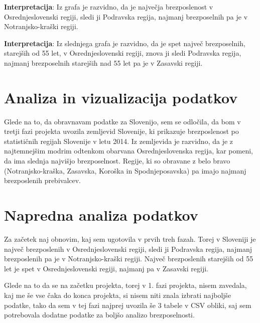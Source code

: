 \documentclass[11pt,a4paper]{article}
\begin{document}
\textbf{Interpretacija}: Iz grafa je razvidno, da je največja brezposlenost v Osrednjeslovenski regiji, sledi ji Podravska regija, najmanj brezposelnih pa je v Notranjsko-kraški regiji.

\textbf{Interpretacija}: Iz slednjega grafa je razvidno, da je spet največ brezposelnih, starejših od 55 let, v Osrednjeslovenski regiji, znova ji sledi Podravska regija, najmanj brezposelnih starejših nad 55 let pa je v Zasavski regiji.

\newpage

\section{Analiza in vizualizacija podatkov}

Glede na to, da obravnavam podatke za Slovenijo, sem se odločila, da bom v tretji fazi projekta uvozila zemljevid Slovenije, ki prikazuje brezposlenost po statističnih regijah Slovenije v letu 2014. Iz zemljevida je razvidno, da je z najtemnejšim modrim odtenkom obarvana Osrednjeslovenska regija, kar pomeni, da ima slednja najvišjo brezposelnost. Regije, ki so obravane z belo bravo (Notranjsko-kraška, Zasavska, Koroška in Spodnjeposavska) pa imajo najmanj brezposlenih prebivalcev.


\newpage

\section{Napredna analiza podatkov}

Za začetek naj obnovim, kaj sem ugotovila v prvih treh fazah. Torej v Sloveniji je največ brezposlenih v Osrednjeslovenski regiji, sledi ji Podravska regija, najmanj brezposlenih pa je v Notranjsko-kraški regiji. Največ brezposlenih starejših od 55 let je spet v Osrednjeslovenski regiji, najmanj pa v Zasavski regiji.


Glede na to da se na začetku projekta, torej v 1. fazi projekta, nisem zavedala, kaj me še vse čaka do konca projekta, si nisem niti znala izbrati najboljše podatke, tako da sem v tej fazi najprej uvozila še 3 tabele v CSV  obliki, saj sem potrebovala dodatne podatke za boljšo analizo brezposelnosti.
\vspace{3mm}
\end{document}
